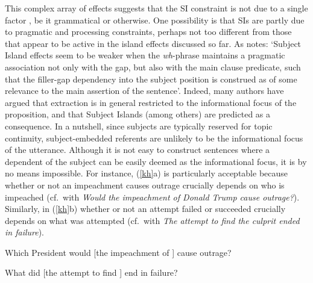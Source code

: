 \documentclass[output=paper]{langsci/langscibook}
\begin{document}
This complex array of effects  suggests that the SI constraint is not due to a single factor
\citep{chomsky08,chavessubj,fernandez}, be it grammatical or otherwise.  One possibility is that SIs are partly due to pragmatic and processing constraints, perhaps not too different from those that appear to be active in the island effects discussed so far. As  \citet[495]{kluender06} notes: `Subject Island effects seem to be  weaker when the  \emph{wh}-phrase maintains a pragmatic  association not only with the gap, but also with the main clause predicate,  such that the filler-gap dependency into the subject position is construed as of some relevance to the main assertion of the sentence'. Indeed, many authors \citep{shir-jrn,valin86,kuno87,ken,Dean,goldberg13} have argued that
extraction is in general restricted to the informational focus of the proposition, and that
Subject Islands (among others) are predicted as a consequence. In a nutshell,
since subjects  are typically reserved for topic continuity,  subject-embedded referents are unlikely to be the informational focus of the utterance.  Although it is not easy to construct sentences where a dependent of the subject can be easily deemed as the informational focus, it is by no means impossible. 
For instance,  (\ref{kh}a) is particularly acceptable because whether or not an impeachment causes outrage crucially depends on who is impeached (cf.\ with  \emph{Would the impeachment of Donald Trump cause outrage?}). Similarly, in (\ref{kh}b) whether or not an attempt failed or succeeded crucially depends on what was attempted (cf.\ with \emph{The attempt to find the culprit ended in failure}). 

\ea
\ea Which President would [the  impeachment of \spcs] cause  outrage? \\
\citep{chavesextr}

 \ex What did [the attempt to find \spcs]  end in failure?\\
 \citep[370]{hofsaglang}
 \z \label{kh}
 \z
 
\end{document}
